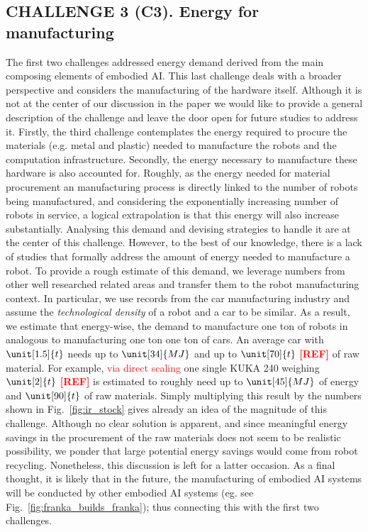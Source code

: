 \subsection{\textbf{CHALLENGE 3} (C3). Energy for manufacturing}
The first two challenges addressed energy demand derived from the main composing elements of embodied AI. This last challenge deals with a broader perspective and considers the manufacturing of the hardware itself. Although it is not at the center of our discussion in the paper we would like to provide a general description of the challenge and leave the door open for future studies to address it. Firstly, the third challenge contemplates the energy required to procure the materials (e.g. metal and plastic) needed to manufacture the robots and the computation infrastructure. Secondly, the energy necessary to manufacture these hardware is also accounted for. Roughly, as the energy needed for material procurement an manufacturing process is directly linked to the number of robots being manufactured, and considering the exponentially increasing number of robots in service, a logical extrapolation is that this energy will also increase substantially. Analysing this demand and devising strategies to handle it are at the center of this challenge. However, to the best of our knowledge, there is a lack of studies that formally address the amount of energy needed to manufacture a robot. To provide a rough estimate of this demand, we leverage numbers from other well researched related areas and transfer them to the robot manufacturing context. In particular, we use records from the car manufacturing industry \cite{sullivan2010energy} and assume the \emph{technological density} of a robot and a car to be similar. As a result, we estimate that energy-wise, the demand to manufacture one ton of robots in analogous to manufacturing one ton one ton of cars. An average car with $\unit[1.5]{t}$ needs up to $\unit[34]{MJ}$ and up to $\unit[70]{t}$ \textcolor{red}{\textbf{[REF]}} of raw material. For example, \textcolor{red}{via direct scaling} one single KUKA 240 weighing $\unit[2]{t}$ \textcolor{red}{\textbf{[REF]}} is estimated to roughly need up to $\unit[45]{MJ}$ of energy and $\unit[90]{t}$ of raw materials. Simply multiplying this result by the numbers shown in Fig.~\ref{fig:ir_stock} gives already an idea of the magnitude of this challenge.  Although no clear solution is apparent, and since  meaningful energy savings in the procurement of the raw materials does not seem to be realistic possibility, we ponder that large potential energy savings would come from robot recycling. Nonetheless, this discussion is left for a latter occasion. As a final thought, it is likely that in the future, the manufacturing of embodied AI systems will be conducted by other embodied AI systems (eg. see Fig.~\ref{fig:franka_builds_franka}); thus connecting this with the first two challenges.
